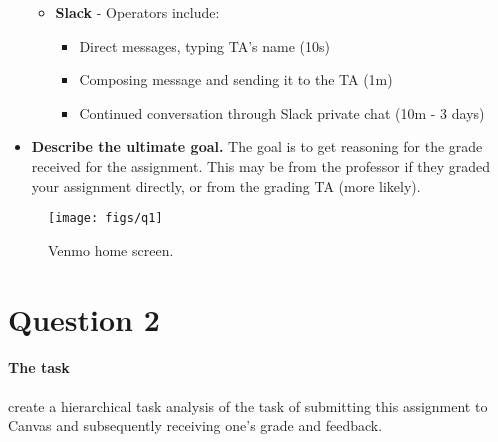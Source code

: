 \begin{itemize}
\begin{itemize}
\begin{itemize}
\clearpage

    \end{itemize}
  \item
    \textbf{Slack} - Operators include:
    \begin{itemize}
    \item
      Direct messages, typing TA's name (10s)
    \item
      Composing message and sending it to the TA (1m)
    \item
      Continued conversation through Slack private chat (10m - 3 days)
    \end{itemize}
  \end{itemize}
\item
  \textbf{Describe the ultimate goal.} The goal is to get reasoning for the grade received for the assignment. This may be from the professor if they graded your assignment directly, or from the grading TA (more likely).
\end{itemize}

\begin{figure}[H]
  \centering
  \texttt{[image: figs/q1]}
  \caption{Venmo home screen.}
  \label{fig::1}
\end{figure}

\section{Question 2}

\paragraph{The task} create a hierarchical task analysis of the task of submitting this assignment to Canvas and subsequently receiving one’s grade and feedback.

